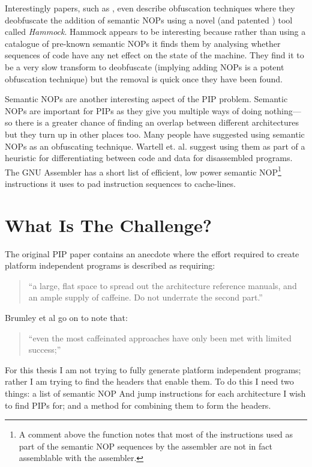 \documentclass[10pt,]{book}
\begin{document}
Interestingly papers, such as
\autocite{Christodorescu:2005vh}\autocite{Christodorescu:2005vf}, even
describe obfuscation techniques where they deobfuscate the addition of
semantic NOPs using a novel (and patented
\autocite{Christodorescu:2009wo}) tool called \emph{Hammock}. Hammock
appears to be interesting because rather than using a catalogue of
pre-known semantic NOPs it finds them by analysing whether sequences of
code have any net effect on the state of the machine. They find it to be
a very slow transform to deobfuscate (implying adding NOPs is a potent
obfuscation technique) but the removal is quick once they have been
found.

Semantic NOPs are another interesting aspect of the PIP problem.
Semantic NOPs are important for PIPs as they give you multiple ways of
doing nothing---so there is a greater chance of finding an overlap
between different architectures but they turn up in other places too.
Many people
\autocite{Christodorescu:2005vh}\autocite{Owens:2011um}\autocite{Bruschi:2007dn}
have suggested using semantic NOPs as an obfuscating technique. Wartell
et. al.\autocite{Wartell:2011ji} suggest using them as part of a
heuristic for differentiating between code and data for disassembled
programs. The GNU Assembler has a short list of efficient, low power
semantic NOP\footnote{A comment above the
  function\autocite{Anonymous:td} notes that most of the instructions
  used as part of the semantic NOP sequences by the assembler are not in
  fact assemblable with the assembler.} instructions it uses to pad
instruction sequences to cache-lines\autocite{Anonymous:td}.

\section{What Is The Challenge?}

The original PIP paper\autocite{Cha:2010uh} contains an anecdote where
the effort required to create platform independent programs is described
as requiring:

\begin{quote}
``a large, flat space to spread out the architecture reference manuals,
and an ample supply of caffeine. Do not underrate the second part.''

\end{quote}
Brumley et al go on to note that:

\begin{quote}
``even the most caffeinated approaches have only been met with limited
success;''

\end{quote}
For this thesis I am not trying to fully generate platform independent
programs; rather I am trying to find the headers that enable them. To do
this I need two things: a list of semantic NOP And jump instructions for
each architecture I wish to find PIPs for; and a method for combining
them to form the headers.
\end{document}

